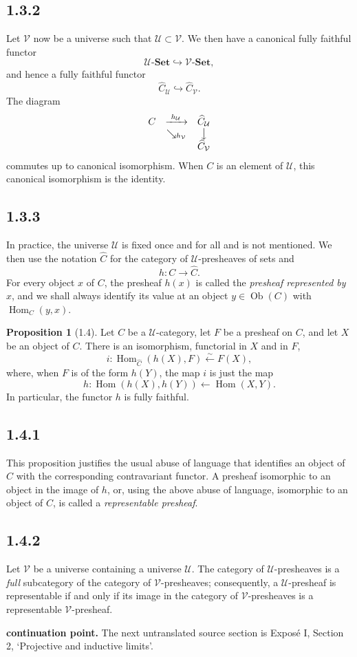 \documentclass[11pt]{article}
\newcommand{\U}{\mathcal{U}}
\newcommand{\V}{\mathcal{V}}
\newcommand{\Ens}{\mathbf{Set}}
\newcommand{\Ob}{\operatorname{Ob}}
\newcommand{\Hom}{\operatorname{Hom}}
\theoremstyle{definition}
\newtheorem*{propositionstar}{Proposition}
\begin{document}
\subsection*{1.3.2}

Let $\V$ now be a universe such that $\U\subset \V$. We then have a canonical fully faithful functor
\[
\U\text{-}\Ens\hookrightarrow \V\text{-}\Ens,
\]
and hence a fully faithful functor
\[
\widehat{C}_{\U}\hookrightarrow \widehat{C}_{\V}.
\]
The diagram
\[
\begin{array}{ccc}
C & \xrightarrow{\ h_{\U}\ } & \widehat{C}_{\U}\\
 & \searrow_{h_{\V}} & \big\downarrow\\
 & & \widehat{C}_{\V}
\end{array}
\]
commutes up to canonical isomorphism. When $C$ is an element of $\U$, this canonical isomorphism is the identity.

\subsection*{1.3.3}

In practice, the universe $\U$ is fixed once and for all and is not mentioned. We then use the notation $\widehat{C}$ for the category of $\U$-presheaves of sets and
\[
h:C\longrightarrow \widehat{C}.
\]
For every object $x$ of $C$, the presheaf $h(x)$ is called the \emph{presheaf represented by} $x$, and we shall always identify its value at an object $y\in\Ob(C)$ with $\Hom_C(y,x)$.

\begin{propositionstar}[1.4]
Let $C$ be a $\U$-category, let $F$ be a presheaf on $C$, and let $X$ be an object of $C$. There is an isomorphism, functorial in $X$ and in $F$,
\[
i:\Hom_{\widehat{C}}(h(X),F)\xleftarrow{\sim} F(X),
\]
where, when $F$ is of the form $h(Y)$, the map $i$ is just the map
\[
h:\Hom(h(X),h(Y))\longleftarrow \Hom(X,Y).
\]
In particular, the functor $h$ is fully faithful.
\end{propositionstar}

\subsection*{1.4.1}

This proposition justifies the usual abuse of language that identifies an object of $C$ with the corresponding contravariant functor. A presheaf isomorphic to an object in the image of $h$, or, using the above abuse of language, isomorphic to an object of $C$, is called a \emph{representable presheaf}.

\subsection*{1.4.2}

Let $\V$ be a universe containing a universe $\U$. The category of $\U$-presheaves is a \emph{full} subcategory of the category of $\V$-presheaves; consequently, a $\U$-presheaf is representable if and only if its image in the category of $\V$-presheaves is a representable $\V$-presheaf.

\bigskip
\noindent\textbf{continuation point.} The next untranslated source section is Exposé I, Section 2, `Projective and inductive limits'.
\end{document}
